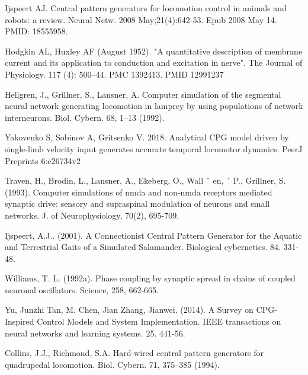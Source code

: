 \documentclass[runningheads]{llncs}
\begin{document}
%
%
%
% 
% 
%
\begin{thebibliography}{99}

Ijspeert AJ. Central pattern generators for locomotion control in animals and robots: a review. Neural Netw. 2008 May;21(4):642-53. Epub 2008 May 14. PMID: 18555958.

Hodgkin AL, Huxley AF (August 1952). "A quantitative description of membrane current and its application to conduction and excitation in nerve". The Journal of Physiology. 117 (4): 500–44. PMC 1392413. PMID 12991237

Hellgren, J., Grillner, S., Lansner, A. Computer simulation of the segmental neural network generating locomotion in lamprey by using populations of network interneurons. Biol. Cybern. 68, 1–13 (1992). 

Yakovenko S, Sobinov A, Gritsenko V. 2018. Analytical CPG model driven by single-limb velocity input generates accurate temporal locomotor dynamics. PeerJ Preprints 6:e26734v2

Traven, H., Brodin, L., Lansner, A., Ekeberg, O., Wall ¨ en, ´
P.,  Grillner, S. (1993). Computer simulations
of nmda and non-nmda receptors mediated synaptic
drive: sensory and supraspinal modulation of neurons
and small networks. J. of Neurophysiology, 70(2),
695-709.

Ijspeert, A.J.. (2001). A Connectionist Central Pattern Generator for the Aquatic and Terrestrial Gaits of a Simulated Salamander. Biological cybernetics. 84. 331-48. 

Williams, T. L. (1992a). Phase coupling by synaptic spread
in chains of coupled neuronal oscillators. Science,
258, 662-665.

Yu, Junzhi  Tan, M. Chen, Jian  Zhang, Jianwei. (2014). A Survey on CPG-Inspired Control Models and System Implementation. IEEE transactions on neural networks and learning systems. 25. 441-56.

Collins, J.J., Richmond, S.A. Hard-wired central pattern generators for quadrupedal locomotion. Biol. Cybern. 71, 375–385 (1994).


\end{thebibliography}
\end{document}
